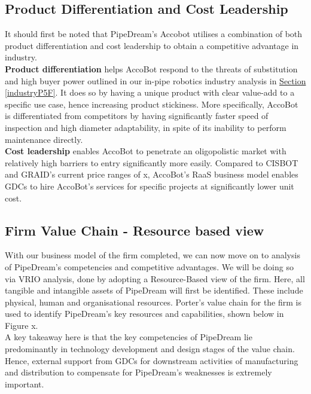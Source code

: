 \documentclass[11pt]{article}		%
\newcommand{\sectref}[1]{\hyperref[#1]{Section \ref*{#1}}}     %
\begin{document}
	\subsection{Product Differentiation and Cost Leadership}
	It should first be noted that PipeDream's Accobot utilises a combination of both product differentiation and cost leadership to obtain a competitive advantage in industry.
	\\ 
	\hspace*{3ex} \textbf{Product differentiation} helps AccoBot respond to the threats of substitution and high buyer power outlined in our in-pipe robotics industry analysis in \sectref{industryP5F}. It does so by having a unique product with clear value-add to a specific use case, hence increasing product stickiness. More specifically, AccoBot is differentiated from competitors by having significantly faster speed of inspection and high diameter adaptability, in spite of its inability to perform maintenance directly. 
	\\ \hspace*{3ex} \textbf{Cost leadership} enables AccoBot to penetrate an oligopolistic market with relatively high barriers to entry significantly more easily. Compared to CISBOT and GRAID's current price ranges of x, AccoBot's RaaS business model enables GDCs to hire AccoBot's services for specific projects at significantly lower unit cost. 
	
	\subsection[Firm Value Chain]{Firm Value Chain - Resource based view}
	With our business model of the firm completed, we can now move on to analysis of PipeDream's competencies and competitive advantages. We will be doing so via VRIO analysis, done by adopting a Resource-Based view of the firm. Here, all tangible and intangible assets of PipeDream will first be identified. These include physical, human and organisational resources. Porter's value chain for the firm is used to identify PipeDream's key resources and capabilities, shown below in Figure x. 
	\\ \hspace*{3ex} A key takeaway here is that the key competencies of PipeDream lie predominantly in technology development and design stages of the value chain. Hence, external support from GDCs for downstream activities of manufacturing and distribution to compensate for PipeDream's weaknesses is extremely important. 
	
\end{document}
